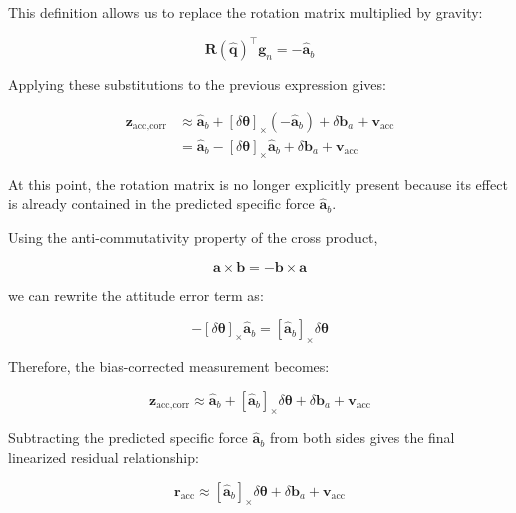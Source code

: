 \documentclass{article}
\begin{document}
	This definition allows us to replace the rotation matrix multiplied by gravity:
	
	\begin{equation*}
		\mathbf{R}(\hat{\mathbf{q}})^\top\mathbf{g}_n
		= -\hat{\mathbf{a}}_b
	\end{equation*}
	
	Applying these substitutions to the previous expression gives:
	
	\begin{align*}
		\mathbf{z}_{\text{acc,corr}}
		&\approx
		\hat{\mathbf{a}}_b
		+ [\delta\boldsymbol{\theta}]_\times
		(-\hat{\mathbf{a}}_b)
		+ \delta\mathbf{b}_a
		+ \mathbf{v}_{\text{acc}} \\[4pt]
		&=
		\hat{\mathbf{a}}_b
		- [\delta\boldsymbol{\theta}]_\times
		\hat{\mathbf{a}}_b
		+ \delta\mathbf{b}_a
		+ \mathbf{v}_{\text{acc}}
	\end{align*}
	
	At this point, the rotation matrix is no longer explicitly present because its effect is already contained in the predicted specific force $\hat{\mathbf{a}}_b$.
	
	Using the anti-commutativity property of the cross product,
	
	\begin{equation*}
		\mathbf{a}\times\mathbf{b}
		= -\mathbf{b}\times\mathbf{a}
	\end{equation*}
	
	we can rewrite the attitude error term as:
	
	\begin{equation*}
		-[\delta\boldsymbol{\theta}]_\times
		\hat{\mathbf{a}}_b
		=
		[\hat{\mathbf{a}}_b]_\times
		\delta\boldsymbol{\theta}
	\end{equation*}
	
	Therefore, the bias-corrected measurement becomes:
	
	\begin{equation}
		\boxed{
			\mathbf{z}_{\text{acc,corr}}
			\approx
			\hat{\mathbf{a}}_b
			+ [\hat{\mathbf{a}}_b]_\times
			\delta\boldsymbol{\theta}
			+ \delta\mathbf{b}_a
			+ \mathbf{v}_{\text{acc}}
		}
	\end{equation}
	
	Subtracting the predicted specific force $\hat{\mathbf{a}}_b$ from both sides gives the final linearized residual relationship:
	
	\begin{equation}
		\boxed{
			\mathbf{r}_{\text{acc}} \approx
			[\hat{\mathbf{a}}_b]_\times
			\delta\boldsymbol{\theta}
			+ \delta\mathbf{b}_a
			+ \mathbf{v}_{\text{acc}}
		}
	\end{equation}
	
\end{document}
